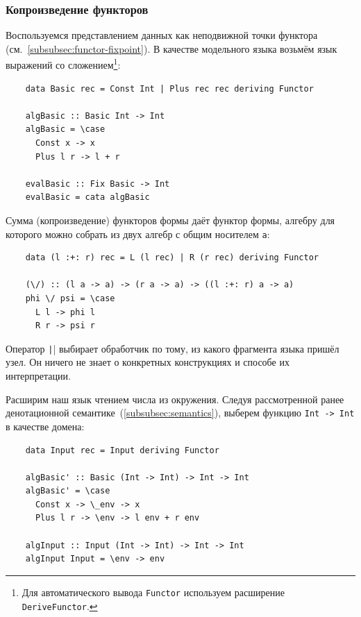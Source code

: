 
\subsubsection{Копроизведение функторов} \label{subsubsec:functor-coprod}

Воспользуемся представлением данных как неподвижной точки функтора (см.~\ref{subsubsec:functor-fixpoint}).
В качестве модельного языка возьмём язык выражений со сложением\footnote{Для автоматического вывода \texttt{Functor} используем расширение \texttt{DeriveFunctor}.}:
\begin{verbatim}
    data Basic rec = Const Int | Plus rec rec deriving Functor

    algBasic :: Basic Int -> Int
    algBasic = \case
      Const x -> x
      Plus l r -> l + r

    evalBasic :: Fix Basic -> Int
    evalBasic = cata algBasic
\end{verbatim}

Сумма (копроизведение) функторов формы даёт функтор формы, алгебру для которого можно собрать из двух алгебр с общим носителем \texttt{a}:
\begin{verbatim}
    data (l :+: r) rec = L (l rec) | R (r rec) deriving Functor

    (\/) :: (l a -> a) -> (r a -> a) -> ((l :+: r) a -> a)
    phi \/ psi = \case
      L l -> phi l
      R r -> psi r
\end{verbatim}

Оператор \texttt|\/| выбирает обработчик по тому, из какого фрагмента языка пришёл узел.
Он ничего не знает о конкретных конструкциях и способе их интерпретации.

Расширим наш язык чтением числа из окружения.
Следуя рассмотренной ранее денотационной семантике~(\ref{subsubsec:semantics}), выберем функцию \texttt{Int -> Int} в качестве домена:
\begin{verbatim}
    data Input rec = Input deriving Functor

    algBasic' :: Basic (Int -> Int) -> Int -> Int
    algBasic' = \case
      Const x -> \_env -> x
      Plus l r -> \env -> l env + r env

    algInput :: Input (Int -> Int) -> Int -> Int
    algInput Input = \env -> env
\end{verbatim}

